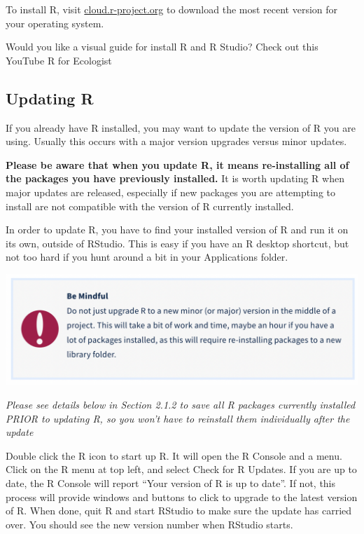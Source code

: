 \documentclass[
]{book}
\begin{document}
To install R, visit \href{https://cloud.r-project.org/}{cloud.r-project.org} to download the most recent version for your operating system.

Would you like a visual guide for install R and R Studio? Check out this YouTube R for Ecologist

\hypertarget{updating-r}{%
\subsection{Updating R}\label{updating-r}}

If you already have R installed, you may want to update the version of R you are using. Usually this occurs with a major version upgrades versus minor updates.

\textbf{Please be aware that when you update R, it means re-installing all of the packages you have previously installed.} It is worth updating R when major updates are released, especially if new packages you are attempting to install are not compatible with the version of R currently installed.

In order to update R, you have to find your installed version of R and run it on its own, outside of RStudio. This is easy if you have an R desktop shortcut, but not too hard if you hunt around a bit in your Applications folder.

\begin{flushleft}\includegraphics{images/rupdate} \end{flushleft}

\emph{Please see details below in Section 2.1.2 to save all R packages currently installed PRIOR to updating R, so you won't have to reinstall them individually after the update}

Double click the R icon to start up R. It will open the R Console and a menu. Click on the R menu at top left, and select Check for R Updates. If you are up to date, the R Console will report ``Your version of R is up to date''. If not, this process will provide windows and buttons to click to upgrade to the latest version of R. When done, quit R and start RStudio to make sure the update has carried over. You should see the new version number when RStudio starts.
\end{document}
